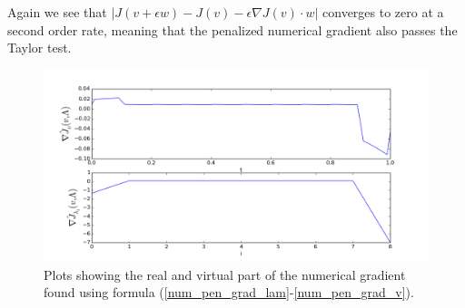 \\
\\
Again we see that $|J(v+\epsilon w)-J(v)-\epsilon \nabla J(v)\cdot w|$ converges to zero at a second order rate, meaning that the penalized numerical gradient also passes the Taylor test.
\begin{figure}[!h]
\centering
\includegraphics[scale=0.5]{pen_num_grad.png}
\caption{Plots showing the real and virtual part of the numerical gradient found using formula (\ref{num_pen_grad_lam}-\ref{num_pen_grad_v}).}
\end{figure}
